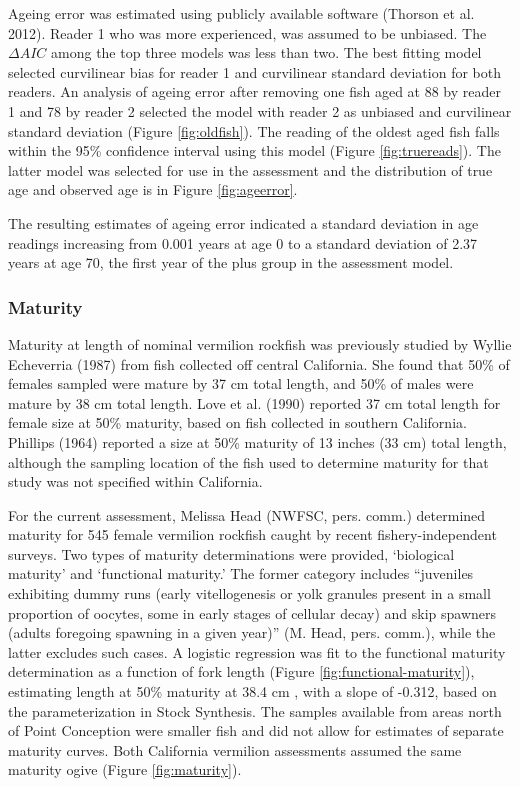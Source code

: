 \documentclass[
  english,
  a4paper,
]{article}
\begin{document}
Ageing error was estimated using publicly available software (Thorson et al. 2012).
Reader 1 who was more
experienced, was assumed to be unbiased. The \(\Delta AIC\) among the top three models was less than two. The
best fitting model selected curvilinear bias for reader 1 and curvilinear standard
deviation for both readers. An analysis of ageing error after removing one fish aged at 88 by reader 1 and 78 by reader 2 selected the model with reader 2 as unbiased and curvilinear standard deviation (Figure \ref{fig:oldfish}). The reading of the oldest aged fish falls within the 95\% confidence interval using this model (Figure \ref{fig:truereads}).
The latter model was selected for use in the assessment and the distribution of
true age and observed age is in Figure \ref{fig:ageerror}.

The resulting estimates of ageing error indicated a standard deviation in age readings
increasing from 0.001 years at age 0 to a standard deviation of 2.37 years at age 70,
the first year of the plus group in the assessment model.

\hypertarget{maturity}{%
\subsubsection{Maturity}\label{maturity}}

Maturity at length of nominal vermilion rockfish was previously studied by Wyllie Echeverria (1987) from fish collected off central California. She found that 50\% of females sampled were mature by 37 cm total length, and 50\% of males were mature by 38 cm total length. Love et al. (1990) reported 37 cm total length for female size at 50\% maturity, based on fish collected in southern California. Phillips (1964) reported a size at 50\% maturity of 13 inches (33 cm) total length, although the sampling location of the fish used to determine maturity for that study was not specified within California.

For the current assessment, Melissa Head (NWFSC, pers. comm.) determined maturity
for 545 female vermilion rockfish caught by recent fishery-independent surveys. Two types
of maturity determinations were provided, `biological maturity' and `functional
maturity.' The former category includes ``juveniles exhibiting dummy runs (early
vitellogenesis or yolk granules present in a small proportion of oocytes, some
in early stages of cellular decay) and skip spawners (adults foregoing spawning
in a given year)'' (M. Head, pers. comm.), while the latter excludes such cases.
A logistic regression was fit to the functional maturity determination as a
function of fork length (Figure \ref{fig:functional-maturity}), estimating
length at 50\% maturity at 38.4 cm , with a slope of -0.312,
based on the parameterization in Stock Synthesis. The samples available from
areas north of Point Conception were smaller fish and did not allow for estimates
of separate maturity curves. Both California vermilion assessments assumed the
same maturity
ogive (Figure \ref{fig:maturity}).
\end{document}
